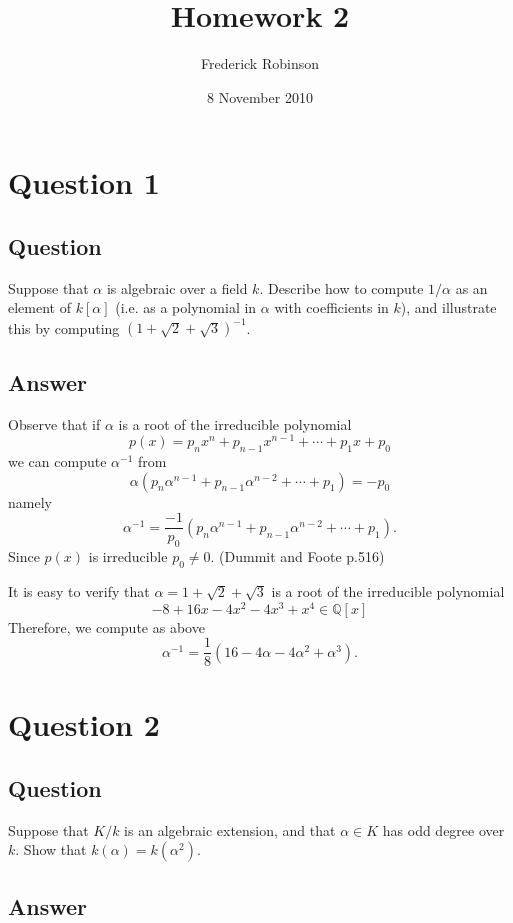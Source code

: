 \documentclass[11pt]{article}
\begin{document}



\title{Homework 2}
\author{Frederick Robinson}
\date{8 November 2010}
\maketitle




\section{Question 1}
\subsection{Question}
Suppose that $\alpha$ is algebraic over a field $k$. Describe how to compute $1/\alpha$ as an element of $k[\alpha]$ (i.e. as a polynomial in $\alpha$ with coefficients in $k$), and illustrate this by computing $(1+\sqrt 2 + \sqrt 3)^{-1}$.
\subsection{Answer}
Observe that if $\alpha$ is a root of the irreducible polynomial
\[p(x) = p_n x^n + p_{n-1} x^{n-1}+ \cdots +p_1 x +p_0\]
we can compute $\alpha^{-1}$ from
\[\alpha (p_n \alpha^{n-1} + p_{n-1}\alpha^{n-2}+ \cdots + p_1) = -p_0\]
namely
\[\alpha^{-1} = \frac{-1}{p_0} (p_n \alpha^{n-1} + p_{n-1}\alpha^{n-2}+ \cdots + p_1). \]
Since $p(x)$ is irreducible $p_0 \neq 0$. (Dummit and Foote p.516)

It is easy to verify that  $\alpha = 1+\sqrt 2 + \sqrt 3$ is a root of the irreducible polynomial 
\[-8 + 16 x - 4 x^2 - 4 x^3 + x^4 \in  \mathbb{Q}[x]\]
Therefore, we compute as above 
\[ \alpha ^{-1} = \frac{1}{8} (16  - 4 \alpha - 4 \alpha^2 + \alpha^3)  .\]



\section{Question 2}
\subsection{Question}
Suppose that $K/k$ is an algebraic extension, and that $\alpha \in K$ has odd degree over $k$. Show that $k(\alpha)=k(\alpha^2).$
\subsection{Answer}
\end{document}
